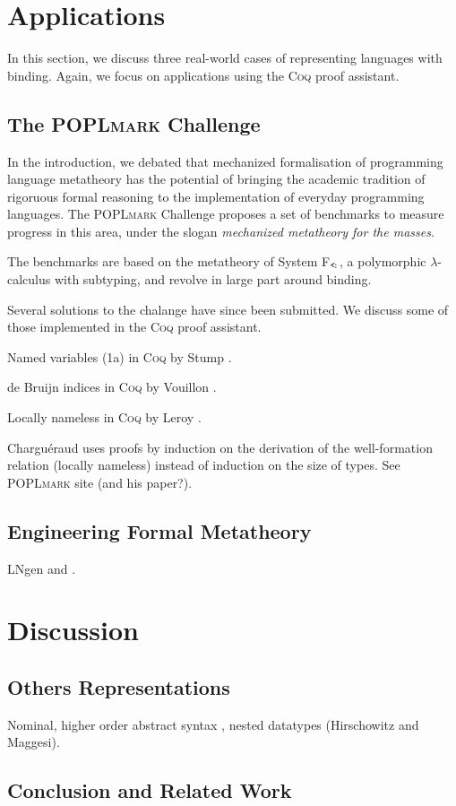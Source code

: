 \documentclass[a4paper,11pt]{article}
\newcommand{\name}[1]{\textsc{#1}\xspace}
\def\Coq{\name{Coq}}
\def\POPLmark{\name{POPLmark}}
\begin{document}
\section{Applications}

In this section, we discuss three real-world cases of representing
languages with binding. Again, we focus on applications using the \Coq
proof assistant.


\subsection{The \POPLmark Challenge}

In the introduction, we debated that mechanized formalisation of
programming language metatheory has the potential of bringing the
academic tradition of rigoruous formal reasoning to the implementation
of everyday programming languages.
The \POPLmark Challenge \cite{Poplmark-Challenge-05} proposes a set of
benchmarks to measure progress in this area, under the slogan {\em
  mechanized metatheory for the masses}.

The benchmarks are based on the metatheory of System
F$_\texttt{<\!:}$, a polymorphic $\lambda$-calculus with subtyping,
and revolve in large part around binding.

Several solutions to the chalange have since been submitted.
We discuss some of those implemented in the \Coq proof assistant.

Named variables (1a) in \Coq by Stump \cite{Stump-05}.

de Bruijn indices in \Coq by Vouillon \cite{Vouillon-05}.

Locally nameless in \Coq by Leroy \cite{Leroy-07}.

Chargu\'eraud uses proofs by induction on the derivation of the
well-formation relation (locally nameless) instead of induction on the
size of types. See \POPLmark site (and his paper?).


\subsection{Engineering Formal Metatheory}

LNgen and \cite{Aydemir-et-al-08}.


\section{Discussion}\label{sec:discussion}

\subsection{Others Representations}

Nominal, higher order abstract syntax \cite{Capretta-Felty-06}, nested datatypes (Hirschowitz and Maggesi).


\subsection{Conclusion and Related Work}


\nocite{*} %


\end{document}
